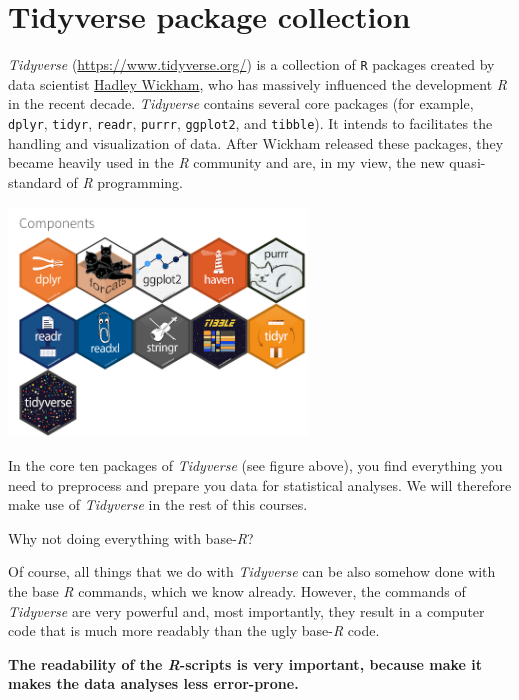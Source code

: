 \documentclass[
]{scrartcl}
\makeatletter
\newenvironment{kframe}{%
\medskip{}
\setlength{\fboxsep}{.8em}
 \def\at@end@of@kframe{}%
 \ifinner\ifhmode%
  \def\at@end@of@kframe{\end{minipage}}%
  \begin{minipage}{\columnwidth}%
 \fi\fi%
 \def\FrameCommand##1{\hskip\@totalleftmargin \hskip-\fboxsep
 \colorbox{shadecolor}{##1}\hskip-\fboxsep
     \hskip-\linewidth \hskip-\@totalleftmargin \hskip\columnwidth}%
 \MakeFramed {\advance\hsize-\width
   \@totalleftmargin\z@ \linewidth\hsize
   \@setminipage}}%
 {\par\unskip\endMakeFramed%
 \at@end@of@kframe}
\newenvironment{rmdblock}[1]
  {
  \begin{itemize}
  \renewcommand{\labelitemi}{
    \raisebox{-.7\height}[0pt][0pt]{
      {\setkeys{Gin}{width=3em,keepaspectratio}\texttt{[image: images/\#1]}}
    }
  }
  \setlength{\fboxsep}{1em}
  \begin{kframe}
  \item
  }
  {
  \end{kframe}
  \end{itemize}
  }
\newenvironment{important}
    {\begin{rmdblock}{hint}}
    {\end{rmdblock}}
\makeatother
\begin{document}
\section{Tidyverse package collection}\label{tidyverse-package-collection}

\emph{Tidyverse} (\url{https://www.tidyverse.org/}) is a collection of \texttt{R} packages created by data scientist \href{http://hadley.nz/}{Hadley Wickham}, who has massively influenced the development \emph{R} in the recent decade. \emph{Tidyverse} contains several core packages (for example, \texttt{dplyr}, \texttt{tidyr}, \texttt{readr}, \texttt{purrr}, \texttt{ggplot2}, and \texttt{tibble}). It intends to facilitates the handling and visualization of data. After Wickham released these packages, they became heavily used in the \emph{R} community and are, in my view, the new quasi-standard of \emph{R} programming.

\begin{center}\includegraphics[width=300px]{images/tidyverse_components} \end{center}

In the core ten packages of \emph{Tidyverse} (see figure above), you find everything you need to preprocess and prepare you data for statistical analyses. We will therefore make use of \emph{Tidyverse} in the rest of this courses.

\begin{important}
Why not doing everything with base-\emph{R}?

Of course, all things that we do with \emph{Tidyverse} can be also
somehow done with the base \emph{R} commands, which we know already.
However, the commands of \emph{Tidyverse} are very powerful and, most
importantly, they result in a computer code that is much more readably
than the ugly base-\emph{R} code.

\textbf{The readability of the \emph{R}-scripts is very important,
because make it makes the data analyses less error-prone.}
\end{important}
\end{document}
